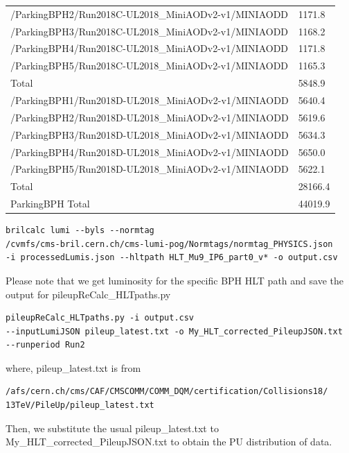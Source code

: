 \begin{table}[htb!]
\begin{center}
\begin{tabular}{l|l}
      /ParkingBPH2/Run2018C-UL2018\_MiniAODv2-v1/MINIAODD  & 1171.8 \\
      /ParkingBPH3/Run2018C-UL2018\_MiniAODv2-v1/MINIAODD  & 1168.2 \\
      /ParkingBPH4/Run2018C-UL2018\_MiniAODv2-v1/MINIAODD  & 1171.8 \\
      /ParkingBPH5/Run2018C-UL2018\_MiniAODv2-v1/MINIAODD  & 1165.3 \\
      Total & 5848.9\\
      \hline
      /ParkingBPH1/Run2018D-UL2018\_MiniAODv2-v1/MINIAODD  & 5640.4 \\
      /ParkingBPH2/Run2018D-UL2018\_MiniAODv2-v1/MINIAODD  & 5619.6 \\
      /ParkingBPH3/Run2018D-UL2018\_MiniAODv2-v1/MINIAODD  & 5634.3 \\
      /ParkingBPH4/Run2018D-UL2018\_MiniAODv2-v1/MINIAODD  & 5650.0 \\
      /ParkingBPH5/Run2018D-UL2018\_MiniAODv2-v1/MINIAODD  & 5622.1 \\
      Total & 28166.4\\
      \hline
      ParkingBPH Total & 44019.9 \\
      \hline
    \end{tabular}
    \label{tab:datasample2018BPH}
  \end{center}
\end{table}


\begin{verbatim}
brilcalc lumi --byls --normtag 
/cvmfs/cms-bril.cern.ch/cms-lumi-pog/Normtags/normtag_PHYSICS.json 
-i processedLumis.json --hltpath HLT_Mu9_IP6_part0_v* -o output.csv
\end{verbatim}
Please note that we get luminosity for the specific BPH HLT path and save the output for pileupReCalc\_HLTpaths.py

\begin{verbatim}
pileupReCalc_HLTpaths.py -i output.csv 
--inputLumiJSON pileup_latest.txt -o My_HLT_corrected_PileupJSON.txt 
--runperiod Run2
\end{verbatim}

where, pileup\_latest.txt is from

\begin{verbatim}
/afs/cern.ch/cms/CAF/CMSCOMM/COMM_DQM/certification/Collisions18/
13TeV/PileUp/pileup_latest.txt
\end{verbatim}


Then, we substitute the usual pileup\_latest.txt to My\_HLT\_corrected\_PileupJSON.txt to obtain the PU distribution of data. 

